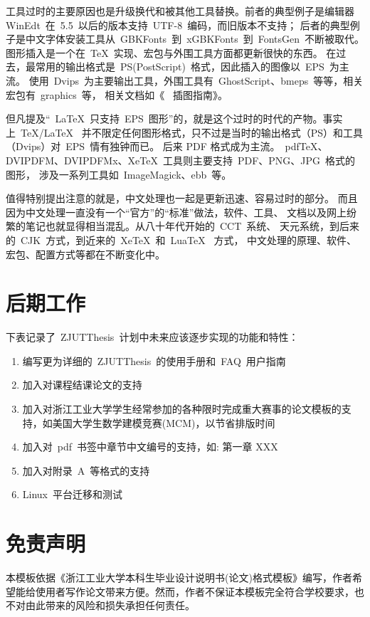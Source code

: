 工具过时的主要原因也是升级换代和被其他工具替换。前者的典型例子是编辑器
WinEdt~在~5.5~以后的版本支持~UTF-8~编码，而旧版本不支持；
后者的典型例子是中文字体安装工具从~GBKFonts~到~xGBKFonts~到~FontsGen~不断被取代。
图形插入是一个在~\TeX~实现、宏包与外围工具方面都更新很快的东西。
在过去，最常用的输出格式是~PS(PostScript)~格式，因此插入的图像以~EPS~为主流。
使用~Dvips~为主要输出工具，外围工具有~GhostScript、bmeps~等等，相关宏包有~graphics~等，
相关文档如《\LaTeXe{}~ 插图指南》。

但凡提及“~\LaTeX~只支持~EPS~图形”的，就是这个过时的时代的产物。事实上~\TeX/\LaTeX~
并不限定任何图形格式，只不过是当时的输出格式（PS）和工具（Dvips）对~EPS~情有独钟而已。
后来 PDF 格式成为主流。~pdf\TeX、DVIPDFM、DVIPDFMx、XeTeX~工具则主要支持~PDF、PNG、JPG~格式的图形，
涉及一系列工具如~ImageMagick、ebb~等。

值得特别提出注意的就是，中文处理也一起是更新迅速、容易过时的部分。
而且因为中文处理一直没有一个“官方”的“标准”做法，软件、工具、
文档以及网上纷繁的笔记也就显得相当混乱。从八十年代开始的~CCT~系统、
天元系统，到后来的~CJK~方式，到近来的~XeTeX~和~LuaTeX~ 方式，
中文处理的原理、软件、宏包、配置方式等都在不断变化中。

\section{后期工作}
下表记录了~ZJUTThesis~计划中未来应该逐步实现的功能和特性：
\begin{enumerate}
  \item 编写更为详细的~ZJUTThesis~的使用手册和~FAQ~用户指南
  \item 加入对课程结课论文的支持
  \item 加入对浙江工业大学学生经常参加的各种限时完成重大赛事的论文模板的支持，如美国大学生数学建模竞赛(MCM)，以节省排版时间
  \item 加入对~pdf~书签中章节中文编号的支持，如: 第一章 XXX
  \item 加入对附录~A~等格式的支持
  \item Linux~平台迁移和测试
\end{enumerate}

\section{免责声明}

本模板依据《浙江工业大学本科生毕业设计说明书(论文)格式模板》编写，作者希望能给使用者写作论文带来方便。然而，作者不保证本模板完全符合学校要求，也不对由此带来的风险和损失承担任何责任。
